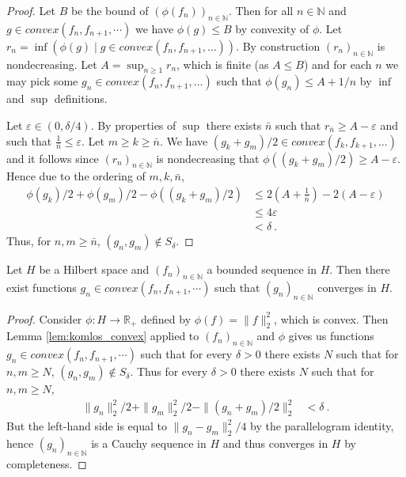 \begin{proof}
  \leanok
Let $B$ be the bound of $(\phi(f_n))_{n\in\mathbb{N}}$.
Then for all $n\in\mathbb{N}$ and $g\in convex(f_n,f_{n+1},\cdots)$ we have $\phi(g)\le B$ by convexity of $\phi$.
Let $r_n = \inf(\phi(g) \mid g\in convex(f_n, f_{n+1},\ldots))$.
By construction $(r_n)_{n\in\mathbb{N}}$ is nondecreasing.
Let $A = \sup_{n \ge 1} r_n$, which is finite (as $A \le B$) and for each $n$ we may pick some $g_n\in convex(f_n, f_{n+1},\ldots)$ such that $\phi(g_n) \le A+1/n$ by $\inf$ and $\sup$ definitions.

Let $\varepsilon \in (0, \delta/4)$.
By properties of $\sup$ there exists $\bar{n}$ such that $r_{\bar{n}} \ge A-\varepsilon$ and such that $\frac{1}{\bar{n}} \le \varepsilon$.
Let $m \ge k \ge \bar{n}$.
We have $(g_k+g_m)/2 \in convex(f_k,f_{k+1},\ldots)$ and it follows since $(r_n)_{n\in\mathbb{N}}$ is nondecreasing that $\phi((g_k+g_m)/2) \ge A - \varepsilon$.
Hence due to the ordering of $m,k,\bar{n}$,
\begin{align*}
  \phi(g_k)/2 + \phi(g_m)/2 - \phi((g_k+g_m)/2)
  &\le 2(A + \frac{1}{\bar{n}}) - 2(A - \varepsilon)
  \\
  &\le 4 \varepsilon
  \\
  &< \delta
  \: .
\end{align*}
Thus, for $n, m \ge \bar{n}$, $(g_n, g_m) \notin S_\delta$.
\end{proof}


\begin{lemma}\label{lem:komlos_norm}
  \leanok
Let $H$ be a Hilbert space and $(f_n)_{n\in\mathbb{N}}$ a bounded sequence in $H$. Then there exist functions $g_n\in convex(f_n,f_{n+1},\cdots)$ such that $(g_n)_{n\in\mathbb{N}}$ converges in $H$.
\end{lemma}

\begin{proof}
  \leanok
Consider $\phi : H \to \mathbb{R}_+$ defined by $\phi(f) = \|f\|_2^2$, which is convex.
Then Lemma \ref{lem:komlos_convex} applied to $(f_n)_{n\in\mathbb{N}}$ and $\phi$ gives us functions $g_n\in convex(f_n,f_{n+1},\cdots)$ such that for every $\delta>0$ there exists $N$ such that for $n,m\geq N$, $(g_n,g_m)\notin S_\delta$.
Thus for every $\delta>0$ there exists $N$ such that for $n,m\geq N$,
\begin{align*}
  \|g_n\|_2^2/2 + \|g_m\|_2^2/2 - \|(g_n+g_m)/2\|_2^2
  &< \delta
  \: .
\end{align*}
But the left-hand side is equal to $\|g_n - g_m\|_2^2/4$ by the parallelogram identity, hence $(g_n)_{n\in\mathbb{N}}$ is a Cauchy sequence in $H$ and thus converges in $H$ by completeness.
\end{proof}


